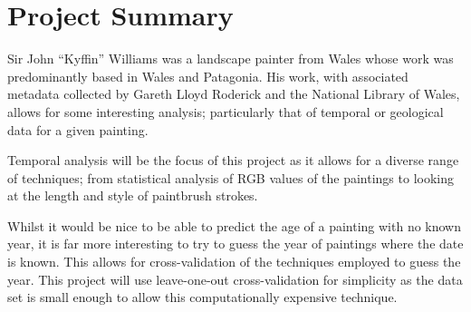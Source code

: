 \documentclass[11pt,fleqn,twoside]{article}
\begin{document}

\mmpversion{\version}

\mmp

\setcounter{tocdepth}{3} %
\tableofcontents
\listoffigures
\listoftables

\newpage

\section{Project Summary}
Sir John ``Kyffin'' Williams was a landscape painter from Wales whose work was predominantly based 
in Wales and Patagonia. His work, with associated metadata collected by Gareth Lloyd Roderick and 
the National Library of Wales, allows for some interesting analysis; particularly that of temporal 
or geological data for a given painting.

Temporal analysis will be the focus of this project as it allows for a diverse range of techniques;
from statistical analysis of RGB values of the paintings to looking at the length and style of 
paintbrush strokes. 

Whilst it would be nice to be able to predict the age of a painting with no known year, it is far
more interesting to try to guess the year of paintings where the date is known. This allows for
cross-validation of the techniques employed to guess the year. This project will use leave-one-out
cross-validation for simplicity as the data set is small enough to allow this computationally 
expensive technique.


\end{document}
